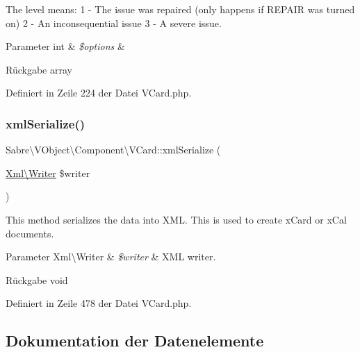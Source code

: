 The level means\+: 1 -\/ The issue was repaired (only happens if R\+E\+P\+A\+IR was turned on) 2 -\/ An inconsequential issue 3 -\/ A severe issue.


\begin{DoxyParams}[1]{Parameter}
int & {\em \$options} & \\
\hline
\end{DoxyParams}
\begin{DoxyReturn}{Rückgabe}
array 
\end{DoxyReturn}


Definiert in Zeile 224 der Datei V\+Card.\+php.

\mbox{\label{class_sabre_1_1_v_object_1_1_component_1_1_v_card_ab197c95d8dcf17e48928155c40f8ba5d}} 
\subsubsection{\texorpdfstring{xml\+Serialize()}{xmlSerialize()}}
{\footnotesize\ttfamily Sabre\textbackslash{}\+V\+Object\textbackslash{}\+Component\textbackslash{}\+V\+Card\+::xml\+Serialize (\begin{DoxyParamCaption}\item[{\mbox{\hyperlink{class_sabre_1_1_xml_1_1_writer}{Xml\textbackslash{}\+Writer}}}]{\$writer }\end{DoxyParamCaption})}

This method serializes the data into X\+ML. This is used to create x\+Card or x\+Cal documents.


\begin{DoxyParams}[1]{Parameter}
Xml\textbackslash{}\+Writer & {\em \$writer} & X\+ML writer.\\
\hline
\end{DoxyParams}
\begin{DoxyReturn}{Rückgabe}
void 
\end{DoxyReturn}


Definiert in Zeile 478 der Datei V\+Card.\+php.



\subsection{Dokumentation der Datenelemente}
\mbox{\label{class_sabre_1_1_v_object_1_1_component_1_1_v_card_ad65c7bafda84527227b2cdfefaedf141}} 
